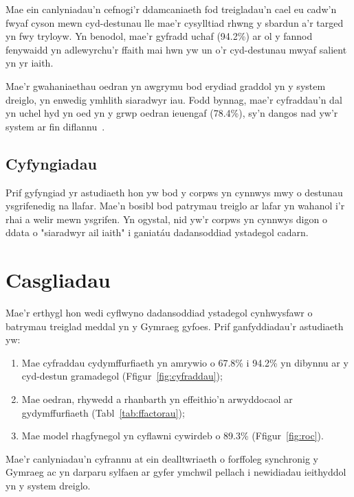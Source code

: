 \documentclass[12pt,a4paper]{article}
\begin{document}
Mae ein canlyniadau'n cefnogi'r ddamcaniaeth fod treigladau'n
cael eu cadw'n fwyaf cyson mewn cyd-destunau lle mae'r
cysylltiad rhwng y sbardun a'r targed yn fwy tryloyw. Yn
benodol, mae'r gyfradd uchaf (94.2\%) ar ol y fannod
fenywaidd yn adlewyrchu'r ffaith mai hwn yw un o'r
cyd-destunau mwyaf salient yn yr iaith.

Mae'r gwahaniaethau oedran yn awgrymu bod erydiad graddol
yn y system dreiglo, yn enwedig ymhlith siaradwyr iau.
Fodd bynnag, mae'r cyfraddau'n dal yn uchel hyd yn oed
yn y grwp oedran ieuengaf (78.4\%), sy'n dangos nad yw'r
system ar fin diflannu~\citep{thomas2020}.

\subsection{Cyfyngiadau}

Prif gyfyngiad yr astudiaeth hon yw bod y corpws yn
cynnwys mwy o destunau ysgrifenedig na llafar. Mae'n
bosibl bod patrymau treiglo ar lafar yn wahanol i'r rhai
a welir mewn ysgrifen. Yn ogystal, nid yw'r corpws yn
cynnwys digon o ddata o "siaradwyr ail iaith" i ganiat\'{a}u
dadansoddiad ystadegol cadarn.

\section{Casgliadau}
\label{sec:casgliadau}

Mae'r erthygl hon wedi cyflwyno dadansoddiad ystadegol
cynhwysfawr o batrymau treiglad meddal yn y Gymraeg gyfoes.
Prif ganfyddiadau'r astudiaeth yw:

\begin{enumerate}
  \item Mae cyfraddau cydymffurfiaeth yn amrywio o 67.8\% i
        94.2\% yn dibynnu ar y cyd-destun gramadegol
        (Ffigur~\ref{fig:cyfraddau});
  \item Mae oedran, rhywedd a rhanbarth yn effeithio'n
        arwyddocaol ar gydymffurfiaeth
        (Tabl~\ref{tab:ffactorau});
  \item Mae model rhagfynegol yn cyflawni cywirdeb o 89.3\%
        (Ffigur~\ref{fig:roc}).
\end{enumerate}

Mae'r canlyniadau'n cyfrannu at ein dealltwriaeth o
forffoleg synchronig y Gymraeg ac yn darparu sylfaen
ar gyfer ymchwil pellach i newidiadau ieithyddol yn y
system dreiglo.
\end{document}
